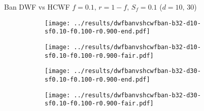 \documentclass[8pt,a4paper]{beamer}
\begin{document}
		
		
	
		\begin{frame}{Ban DWF vs HCWF $f=0.1,\, r=1-f,\,S_f=0.1$ ($d=10,\, 30$)}
			\begin{figure}
				\begin{subfigure}{.48\textwidth}
					\centering
					\texttt{[image: ../results/dwfbanvshcwfban-b32-d10-sf0.10-f0.100-r0.900-end.pdf]}
				\end{subfigure}
				\begin{subfigure}{.48\textwidth}
					\centering
					\texttt{[image: ../results/dwfbanvshcwfban-b32-d10-sf0.10-f0.100-r0.900-fair.pdf]}
				\end{subfigure}
			\end{figure}
			
			\begin{figure}
				\begin{subfigure}{.48\textwidth}
					\centering
					\texttt{[image: ../results/dwfbanvshcwfban-b32-d30-sf0.10-f0.100-r0.900-end.pdf]}
				\end{subfigure}
				\begin{subfigure}{.48\textwidth}
					\centering
					\texttt{[image: ../results/dwfbanvshcwfban-b32-d30-sf0.10-f0.100-r0.900-fair.pdf]}
				\end{subfigure}
			\end{figure}
		\end{frame}
	
\end{document}
